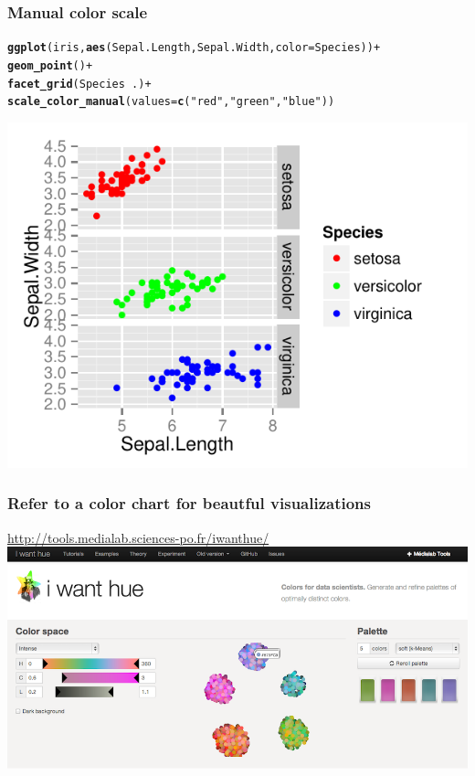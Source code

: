 \documentclass{beamer}\usepackage[]{graphicx}\usepackage[]{color}
\makeatletter
\newcommand{\hlstr}[1]{\textcolor[rgb]{0.192,0.494,0.8}{#1}}%
\newcommand{\hlopt}[1]{\textcolor[rgb]{0,0,0}{#1}}%
\newcommand{\hlstd}[1]{\textcolor[rgb]{0.345,0.345,0.345}{#1}}%
\newcommand{\hlkwc}[1]{\textcolor[rgb]{0.333,0.667,0.333}{#1}}%
\newcommand{\hlkwd}[1]{\textcolor[rgb]{0.737,0.353,0.396}{\textbf{#1}}}%
\newenvironment{kframe}{%
 \def\at@end@of@kframe{}%
 \ifinner\ifhmode%
  \def\at@end@of@kframe{\end{minipage}}%
  \begin{minipage}{\columnwidth}%
 \fi\fi%
 \def\FrameCommand##1{\hskip\@totalleftmargin \hskip-\fboxsep
 \colorbox{shadecolor}{##1}\hskip-\fboxsep
     \hskip-\linewidth \hskip-\@totalleftmargin \hskip\columnwidth}%
 \MakeFramed {\advance\hsize-\width
   \@totalleftmargin\z@ \linewidth\hsize
   \@setminipage}}%
 {\par\unskip\endMakeFramed%
 \at@end@of@kframe}
\newenvironment{knitrout}{}{} %
\makeatother
\begin{document}
\begin{frame}[fragile]
\frametitle{Manual color scale}
\begin{knitrout}\footnotesize
{}\color{fgcolor}\begin{kframe}
\begin{alltt}
\hlkwd{ggplot}\hlstd{(iris,} \hlkwd{aes}\hlstd{(Sepal.Length, Sepal.Width,} \hlkwc{color} \hlstd{= Species))} \hlopt{+}
\hlkwd{geom_point}\hlstd{()} \hlopt{+}
\hlkwd{facet_grid}\hlstd{(Species} \hlopt{~} \hlstd{.)} \hlopt{+}
\hlkwd{scale_color_manual}\hlstd{(}\hlkwc{values} \hlstd{=} \hlkwd{c}\hlstd{(}\hlstr{"red"}\hlstd{,} \hlstr{"green"}\hlstd{,} \hlstr{"blue"}\hlstd{))}
\end{alltt}
\end{kframe}

{\centering \includegraphics[width=.75\linewidth]{figure/facetgridcolors} 

}



\end{knitrout}

\end{frame}


\begin{frame}[fragile]
\frametitle{Refer to a color chart for beautful visualizations}
\begin{center}
\url{http://tools.medialab.sciences-po.fr/iwanthue/}
\newline
\newline
\includegraphics[scale=0.25]{images/color_schemes.png}
\end{center}
\end{frame}
\end{document}
